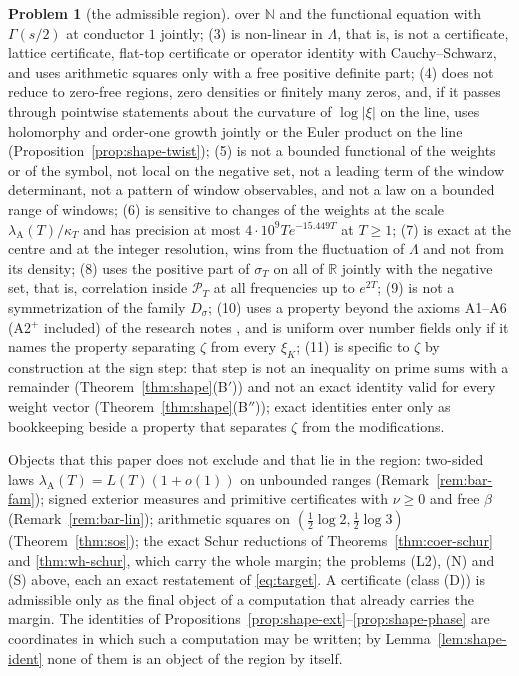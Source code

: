 \documentclass[11pt]{amsart}
\theoremstyle{definition}
\newtheorem{problem}[theorem]{Problem}
\theoremstyle{remark}
\newcommand{\R}{\mathbb R}
\newcommand{\N}{\mathbb N}
\newcommand{\PT}{\mathcal P_T}
\newcommand{\lamA}{\lambda_{\mathrm A}(T)}
\newcommand{\sT}{\sigma_T}
\begin{document}
\begin{enumerate}
\begin{problem}[the admissible region]
over $\N$ and the functional equation with $\Gamma(s/2)$ at conductor $1$ jointly; (3) is non-linear in $\Lambda$, that is, is not a
certificate, lattice certificate, flat-top certificate or operator identity with Cauchy--Schwarz, and uses arithmetic squares only with a
free positive definite part; (4) does not reduce to zero-free regions, zero densities or finitely many zeros, and, if it passes through
pointwise statements about the curvature of $\log|\xi|$ on the line, uses holomorphy and order-one growth jointly or the Euler product on
the line (Proposition~\ref{prop:shape-twist}); (5) is not a bounded functional of the weights or of the symbol, not local on the
negative set, not a leading term of the window determinant, not a pattern of window observables, and not a law on a bounded range of
windows; (6) is sensitive to changes of the weights at the scale $\lamA/\kappa_T$ and has precision at most $4\cdot10^9Te^{-15.449T}$
at $T\ge1$; (7) is exact at the centre and at the integer resolution, wins from the fluctuation of $\Lambda$ and not from its density;
(8) uses the positive part of $\sT$ on all of $\R$ jointly with the negative set, that is, correlation inside $\PT$ at all frequencies
up to $e^{2T}$; (9) is not a symmetrization of the family $D_\sigma$; (10) uses a property beyond the axioms A1--A6 (A2$^+$ included) of the research notes \cite[\S18]{Paper46},
and is uniform over number fields only if it names the property separating $\zeta$ from every $\xi_K$; (11) is specific to $\zeta$ by
construction at the sign step: that step is not an inequality on prime sums with a remainder (Theorem~\ref{thm:shape}(B$'$)) and not an exact
identity valid for every weight vector (Theorem~\ref{thm:shape}(B$''$)); exact identities enter only as bookkeeping beside a property that
separates $\zeta$ from the modifications.
\end{problem}
Objects that this paper does not exclude and that lie in the region: two-sided laws $\lamA=L(T)(1+o(1))$ on unbounded ranges
(Remark~\ref{rem:bar-fam}); signed exterior measures and primitive certificates with $\nu\ge0$ and free $\beta$ (Remark~\ref{rem:bar-lin});
arithmetic squares on $(\frac12\log2,\frac12\log3)$ (Theorem~\ref{thm:sos}); the exact Schur reductions of Theorems~\ref{thm:coer-schur}
and \ref{thm:wh-schur}, which carry the whole margin; the problems (L2), (N) and (S) above, each an exact restatement of
\eqref{eq:target}. A certificate (class (D)) is admissible only as the final object of a computation that already carries the margin.
The identities of Propositions~\ref{prop:shape-ext}--\ref{prop:shape-phase} are coordinates in which such a computation may be written; by
Lemma~\ref{lem:shape-ident} none of them is an object of the region by itself.
\end{enumerate}
\end{document}
